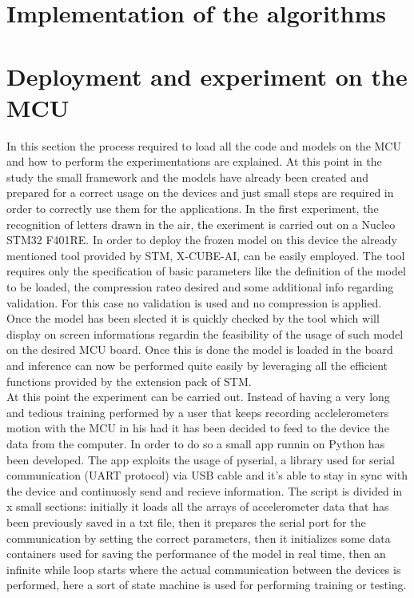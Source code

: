 \documentclass[12pt]{report}
\begin{document}
\section{Implementation of the algorithms}



\section{Deployment and experiment on the MCU}
In this section the process required to load all the code and models on the MCU and how to perform the experimentations are explained. At this point in the study the small framework and the models have already been created and prepared for a correct usage on the devices and just small steps are required in order to correctly use them for the applications. \bigskip
In the first experiment, the recognition of letters drawn in the air, the exeriment is carried out on a Nucleo STM32 F401RE. In order to deploy the frozen model on this device the already mentioned tool provided by STM, X-CUBE-AI, can be easily employed. The tool requires only the specification of basic parameters like the definition of the model to be loaded, the compression rateo desired and some additional info regarding validation. For this case no validation is used and no compression is applied. Once the model has been slected it is quickly checked by the tool which will display on screen informations regardin the feasibility of the usage of such model on the desired MCU board. Once this is done the model is loaded in the board and inference can now be performed quite easily by leveraging all the efficient functions provided by the extension pack of STM. \\
At this point the experiment can be carried out. Instead of having a very long and tedious training performed by a user that keeps recording acclelerometers motion with the MCU in his had it has been decided to feed to the device the data from the computer. In order to do so a small app runnin on Python has been developed. The app exploits the usage of pyserial, a library used for serial communication (UART protocol) via USB cable and it's able to stay in sync with the device and continuosly send and recieve information. 
The script is divided in x small sections: initially it loads all the arrays of accelerometer data that has been previously saved in a txt file, then it prepares the serial port for the communication by setting the correct parameters, then it initializes some data containers used for saving the performance of the model in real time, then an infinite while loop starts where the actual communication between the devices is performed, here a sort of state machine is used for performing training or testing. 
\end{document}
